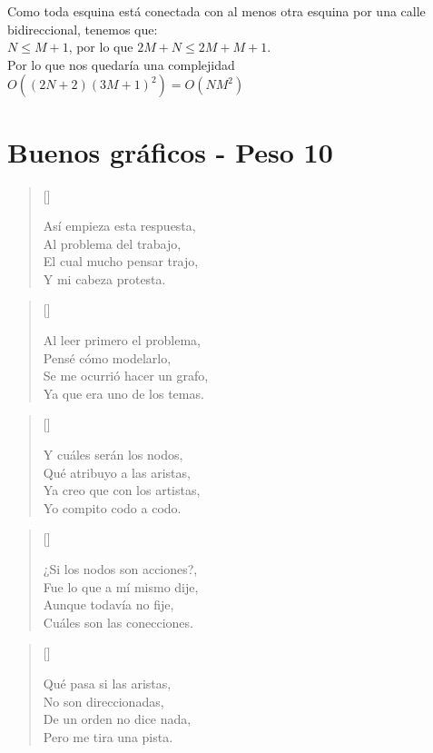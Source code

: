 \documentclass[a4paper]{article}
\newcommand{\verso}[1] {
\settowidth{\versewidth}{123456789012345678901234567890}%
\begin{minipage}[t]{\dimexpr\versewidth+1pt\relax}
\begin{verse}[\versewidth]
{\fontfamily{qzc}\selectfont\large
  #1
}
\end{verse}
\end{minipage}\bigskip
}
\begin{document}
Como toda esquina está conectada con al menos otra esquina por una calle bidireccional, tenemos que:\\

$N \leq M + 1$, por lo que $2M + N \leq 2M + M + 1$.\\

Por lo que nos quedaría una complejidad $O((2N+2)(3M+1)^2) = O(NM^2)$





\pagebreak
  \section{Buenos gr\'aficos - Peso 10}

\begin{minipage}[t]{0.4\columnwidth}
\verso{
Así empieza esta respuesta,\\
Al problema del trabajo,\\
El cual mucho pensar trajo,\\
Y mi cabeza protesta.\\
}
\verso{
Al leer primero el problema,\\
Pensé cómo modelarlo,\\
Se me ocurrió hacer un grafo,\\
Ya que era uno de los temas.\\
}
\verso{
Y cuáles serán los nodos,\\
Qué atribuyo a las aristas,\\
Ya creo que con los artistas,\\
Yo compito codo a codo.\\
}
\verso{
¿Si los nodos son acciones?,\\
Fue lo que a mí mismo dije,\\
Aunque todavía no fije,\\
Cuáles son las conecciones.\\
}
\verso{
Qué pasa si las aristas,\\
No son direccionadas,\\
De un orden no dice nada,\\
Pero me tira una pista.\\
}
\end{minipage}%
\end{document}
